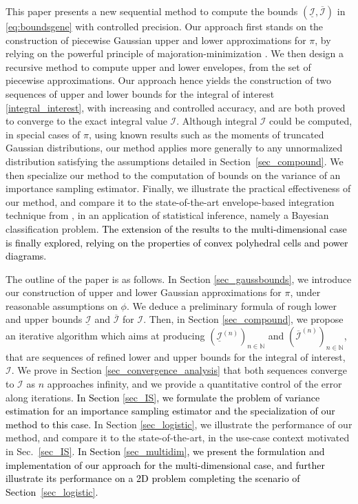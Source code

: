 \documentclass[review]{elsarticle}
\newcommand{\cblue}{\textcolor{black}}
\newcommand{\Ic}{\mathcal{I}}
\newcommand{\bN}{\mathbb{N}}
\begin{document}
This paper presents a new sequential method to compute the bounds $(\underline{\Ic},\overline{\Ic})$ in \eqref{eq:boundsgene}
with controlled precision. Our approach first stands on the construction of piecewise Gaussian upper and lower approximations for $\pi$, by relying on the powerful principle of majoration-minimization \cite{chouzenoux:hal-00789962,chouzenoux:hal-04250055,Sun2017}. We then design a recursive method to compute upper and lower envelopes, from the set of piecewise approximations. Our approach hence yields the construction of two sequences of upper and lower bounds for the integral of interest \eqref{integral_interest}, with increasing and controlled accuracy, and are both proved to converge to the exact integral value $\Ic$. Although integral $\mathcal{I}$ could be computed, in special cases of $\pi$, using known results such as the moments of truncated Gaussian distributions, our method applies more generally to any unnormalized distribution satisfying the assumptions detailed in Section~\ref{sec_compound}. We then specialize our method to the computation of bounds on the variance of an importance sampling estimator. Finally, we illustrate the practical effectiveness of our method, and compare it to the state-of-the-art envelope-based integration technique from \cite[Sec.5.4]{EvansSwartz2000}, in an application of statistical inference, namely a Bayesian classification problem. \cblue{The extension of the results to the multi-dimensional case is finally explored, relying on the properties of convex polyhedral cells and power diagrams.}



The outline of the paper is as follows. In Section \ref{sec_gaussbounds}, we introduce our construction of upper and lower Gaussian approximations for $\pi$, under reasonable assumptions on $\phi$. We deduce a preliminary formula of rough lower and upper bounds $\underline{\Ic}$ and $\overline{\Ic}$ for $\Ic$. Then, in Section \ref{sec_compound}, we propose an iterative algorithm which aims at producing $(\underline{\Ic}^{(n)})_{n \in \bN}$ and $(\overline{\Ic}^{(n)})_{n \in \bN}$, that are sequences of refined lower and upper bounds for the integral of interest, $\Ic$. We prove in Section \ref{sec_convergence_analysis} that both sequences converge to $\Ic$ as $n$ approaches infinity, and we provide a quantitative control of the error along iterations. \cblue{In Section \ref{sec_IS}, we formulate the problem of variance estimation for an importance sampling estimator and the specialization of our method to this case.} In Section \ref{sec_logistic}, we illustrate the performance of our method, and compare it to the state-of-the-art, in the use-case context motivated in Sec.~\ref{sec_IS}. \cblue{In Section \ref{sec_multidim}, we present the formulation and implementation of our approach for the multi-dimensional case, and further illustrate its performance on a 2D problem completing the scenario of Section~\ref{sec_logistic}.}
\end{document}
